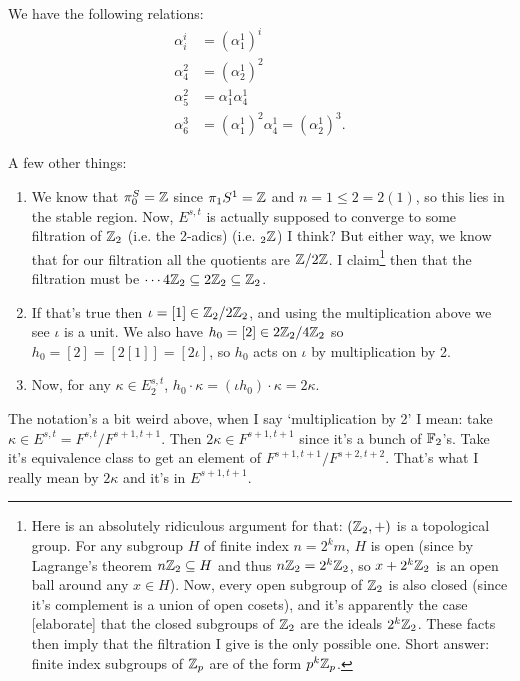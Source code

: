 \documentclass{MetricNotes2023}
\def\bb{\ensuremath\mathbb}
\def\subq{\ensuremath\subseteq}
\def\inte{\ensuremath\mathbb{Z}}
\begin{document}

\begin{proposition}
We have the following relations:
\begin{align*}
\alpha^i_i &= (\alpha_1^1)^i\\
\alpha_4^2&=(\alpha^1_2)^2\\
\alpha^2_5&=\alpha^1_1 \alpha^1_4\\
\alpha^3_6&=(\alpha^1_1)^2 \alpha_4^1=(\alpha^1_2)^3.
\end{align*}
\end{proposition}

A few other things:
\begin{enumerate}
\item We know that \(\pi_0^S=\inte\) since \(\pi_1S^1=\inte\) and \(n=1\leq 2=2(1)\), so this lies in the stable region. Now, \(E^{s,t}\) is actually supposed to converge to some filtration of \(\inte_2\) (i.e. the 2-adics) (i.e. \(\text{}_2\inte\)) I think? But either way, we know that for our filtration all the quotients are \(\inte/2\inte\). I claim\footnote{Here is an absolutely ridiculous argument for that: \((\inte_2, +)\) is a topological group. For any subgroup \(H\) of finite index \(n=2^km\), \(H\) is open (since by Lagrange's theorem \(n\inte_2\subq H\) and thus \(n\inte_2=2^k\inte_2\), so \(x+2^k\inte_2\) is an open ball around any \(x\in H\)). Now, every open subgroup of \(\inte_2\) is also closed (since it's complement is a union of open cosets), and it's apparently the case [elaborate] that the closed subgroups of \(\inte_2\) are the ideals \(2^k\inte_2\). These facts then imply that the filtration I give is the only possible one. Short answer: finite index subgroups of \(\inte_p\) are of the form \(p^k\inte_p\).} then that the filtration must be \(\cdots 4\inte_2 \subq 2\inte_2 \subq \inte_2\). 
\item If that's true then \(\iota=[1]\in \inte_2/2\inte_2\), and using the multiplication above we see \(\iota\) is a unit. We also have \(h_0=[2]\in 2\inte_2/4\inte_2\) so \(h_0=[2]=[2[1]]=[2\iota]\), so \(h_0\) acts on \(\iota\) by multiplication by 2.
\item Now, for any \(\kappa\in E^{s,t}_2\), \(h_0\cdot \kappa = (\iota h_0)\cdot \kappa=2\kappa\). 
\end{enumerate}
The notation's a bit weird above, when I say `multiplication by 2' I mean: take \(\kappa \in E^{s,t}=F^{s,t}/F^{s+1,t+1}\). Then \(2\kappa \in F^{s+1,t+1}\) since it's a bunch of \(\bb{F}_2\)'s. Take it's equivalence class to get an element of \(F^{s+1, t+1}/F^{s+2,t+2}\). That's what I really mean by \(2\kappa\) and it's in \(E^{s+1,t+1}\).
\end{document}
